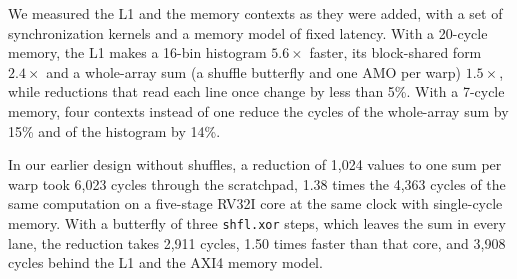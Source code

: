We measured the L1 and the memory contexts as they were added, with a set of
synchronization kernels and a memory model of fixed latency. With a 20-cycle
memory, the L1 makes a 16-bin histogram $5.6\times$ faster, its block-shared form
$2.4\times$ and a whole-array sum (a shuffle butterfly and one AMO per warp)
$1.5\times$, while reductions that read each line once change by less than 5\%.
With a 7-cycle memory, four contexts instead of one reduce the cycles of the
whole-array sum by 15\% and of the histogram by 14\%.

In our earlier design without shuffles, a reduction of 1,024 values to one sum
per warp took 6,023 cycles through the scratchpad, 1.38 times the 4,363 cycles of
the same computation on a five-stage RV32I core at the same clock with
single-cycle memory. With a butterfly of three \texttt{shfl.xor} steps, which
leaves the sum in every lane, the reduction takes 2,911 cycles, 1.50 times faster
than that core, and 3,908 cycles behind the L1 and the AXI4 memory model.


